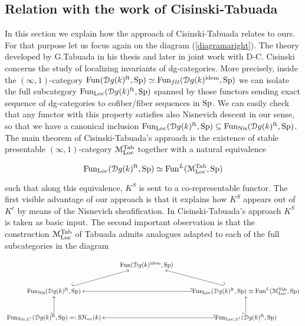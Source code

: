 \begin{refsection}
\section{Relation with the work of Cisinski-Tabuada}

In this section we explain how the approach of Cisinski-Tabuada relates to ours. For that purpose let us focus again on the diagram  (\ref{diagramaright}). The theory developed by G.Tabuada \cite{tabuada-higherktheory} in his thesis and later in joint work with D-C. Cisinski \cite{tabuada-cisinski, MR2822869} concerns the study of localizing invariants of dg-categories. More precisely, inside the $(\infty,1)$-category $\mathrm{Fun}(\mathcal{D}g(k)^\mathrm{ft}, \mathrm{Sp})\simeq \mathrm{Fun}_{flt}(\mathcal{D}g(k)^\mathrm{idem}, \mathrm{Sp})$ we can isolate the full subcategory $\mathrm{Fun}_\mathrm{Loc}(\mathcal{D}g(k)^\mathrm{ft}, \mathrm{Sp})$ spanned by those functors sending exact sequence of dg-categories to cofiber/fiber sequences in $\mathrm{Sp}$. We can easily check that any functor with this property satisfies also Nisnevich descent in our sense, so that we have a canonical inclusion  $\mathrm{Fun}_\mathrm{Loc}(\mathcal{D}g(k)^\mathrm{ft}, \mathrm{Sp})\subseteq \mathrm{Fun}_\mathrm{Nis}(\mathcal{D}g(k)^\mathrm{ft}, \mathrm{Sp})$. The main theorem of Cisinski-Tabuada's approach is the existence of stable presentable $(\infty,1)$-category $\mathcal{M}^\mathrm{Tab}_\mathrm{Loc}$ together with a natural equivalence 

\begin{equation}
\label{final}
\mathrm{Fun}_\mathrm{Loc}(\mathcal{D}g(k)^\mathrm{ft}, \mathrm{Sp})\simeq \mathrm{Fun}^L(\mathcal{M}^\mathrm{Tab}_\mathrm{Loc},\mathrm{Sp})
\end{equation}

\noindent such that along this equivalence, $K^S$ is sent to a co-representable functor. The first visible advantage of our approach is that it explains how $K^S$ appears out of $K^c$ by means of the Nisnevich sheafification. In Cisinski-Tabuada's approach $K^S$ is taken as basic input. The second important observation is that the construction  $\mathcal{M}^\mathrm{Tab}_\mathrm{Loc}$ of Tabuada admits analogues adapted to each of  the full subcategories in the diagram


\begin{equation}
\xymatrix{
&\mathrm{Fun}(\mathcal{D}g(k)^\mathrm{idem}, \Sp)&\\
 \mathrm{Fun}_\mathrm{Nis}(\mathcal{D}g(k)^\mathrm{ft}, \Sp)\ar@{^{(}->}[ur]&&\ar@{_{(}->}[ll] \ar@{_{(}->}[ul]\mathrm{Fun}_\mathrm{Loc}(\mathcal{D}g(k)^\mathrm{ft}, \Sp)\simeq \mathrm{Fun}^{L}(\M^\mathrm{Tab}_\mathrm{Loc}, \Sp)\\
 \mathrm{Fun}_{\mathrm{Nis}, \mathbb{A}^1}(\mathcal{D}g(k)^\mathrm{ft}, \Sp)=: \stnck\ar@{^{(}->}[u]&&\ar@{_{(}->}[ll]\ar@{^{(}->}[u]\mathrm{Fun}_{\mathrm{Loc}, \mathbb{A}^1}(\mathcal{D}g(k)^\mathrm{ft}, \Sp)
}
\end{equation}




\end{refsection}
